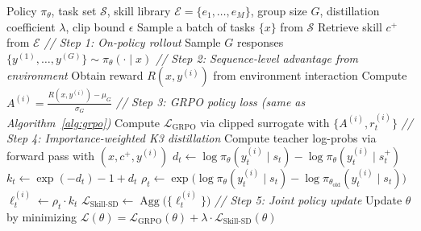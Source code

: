 \documentclass{llmxive}
\providecommand{\mycomment}[1]{\textit{// #1}}
\begin{document}
\begin{algorithm}[t]
  \caption{Skill-SD}
  \label{alg:skillsd}
  \begin{algorithmic}[1]
  \Require Policy $\pi_{\theta}$, task set $\mathcal{S}$, skill library $\mathcal{E} =
  \{e_1,\dots,e_M\}$, group size $G$, distillation coefficient $\lambda$, clip
  bound $\epsilon$
      \State Sample a batch of tasks $\{x\}$ from $\mathcal{S}$
          \State Retrieve skill $c^{+}$ from $\mathcal{E}$ 
          \State \mycomment{Step 1: On-policy rollout}
          \State Sample $G$ responses $\{y^{(1)},\dots,y^{(G)}\} \sim \pi_{\theta}(\cdot \mid
  x)$
          \State \mycomment{Step 2: Sequence-level advantage from environment}
              \State Obtain reward $R(x, y^{(i)})$ from environment interaction
          \EndFor
          \State Compute $A^{(i)} = \frac{R(x,y^{(i)}) - \mu_G}{\sigma_G}$
          \State \mycomment{Step 3: GRPO policy loss (same as Algorithm~\ref{alg:grpo})}
          \State Compute $\mathcal{L}_{\mathrm{GRPO}}$ via clipped surrogate with $\{A^{(i)},
  r_t^{(i)}\}$
          \State \mycomment{Step 4: Importance-weighted K3 distillation}
              \State Compute teacher log-probs via forward pass with $(x, c^{+}, y^{(i)})$
                  \State $d_t \gets \log\pi_{\theta}(y_t^{(i)} \mid s_t) -
  \log\pi_{\theta}(y_t^{(i)} \mid s_t^{+})$
                  \State $k_t \gets \exp(-d_t) - 1 + d_t$
                  \State $\rho_t \gets \exp\!\bigl(\log\pi_{\theta}(y_t^{(i)} \mid s_t) -
  \log\pi_{\theta_{\mathrm{old}}}(y_t^{(i)} \mid s_t)\bigr)$
                  \State $\ell_t^{(i)} \gets \rho_t \cdot k_t$
              \EndFor
          \EndFor
          \State $\mathcal{L}_{\text{Skill-SD}} \gets
  \operatorname{Agg}\!\bigl(\{\ell_t^{(i)}\}\bigr)$
          \State \mycomment{Step 5: Joint policy update}
          \State Update $\theta$ by minimizing $\mathcal{L}(\theta) =
  \mathcal{L}_{\mathrm{GRPO}}(\theta) + \lambda \cdot \mathcal{L}_{\text{Skill-SD}}(\theta)$
      \EndFor
  \EndFor
  \end{algorithmic}
\end{algorithm}
\end{document}
